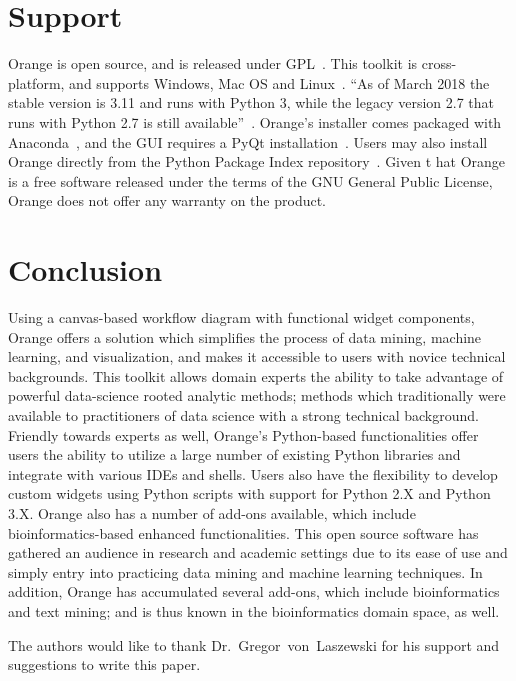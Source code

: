 \section{Support}
Orange is open source, and is released under
GPL~\cite{hid-sp18-504-journalorange}.
This toolkit is cross-platform, and supports Windows, Mac OS and
Linux~\cite{hid-sp18-504-wiki-orange}.
``As of March 2018 the stable version is 3.11 and runs with Python 3,
while the legacy version 2.7 that runs with
Python 2.7 is still available''~\cite{hid-sp18-504-wiki-orange}.
Orange’s installer comes packaged with
Anaconda~\cite{hid-sp18-504-analyticsvidhya}, and the GUI requires a
PyQt installation~\cite{hid-sp18-504-orange}. Users may also install
Orange directly from the Python Package Index
repository~\cite{hid-sp18-504-journalorange}. Given t
hat Orange is a free
software released under the terms of the GNU General Public License,
Orange does not offer any warranty on the product.


\section{Conclusion}

Using a canvas-based workflow diagram with functional widget components,
Orange offers a solution which simplifies the process of data mining,
machine learning, and visualization, and makes it accessible to users with
novice technical backgrounds. This toolkit allows domain experts the ability
to take advantage of powerful data-science rooted analytic methods; methods
which traditionally were available to practitioners of
data science with a strong
technical background. Friendly towards experts as well, Orange’s
Python-based
functionalities offer users the ability to utilize a large number of existing
Python libraries and integrate with various IDEs and shells. Users also have
the flexibility to develop custom widgets using Python scripts with support
for Python 2.X and Python 3.X. Orange also has a number of add-ons available,
which include bioinformatics-based enhanced functionalities. This open
source software has gathered an audience in research and academic
settings due to its ease of use and simply entry into practicing
data mining and machine learning techniques. In addition, Orange
has accumulated several add-ons, which include bioinformatics
and text mining; and is thus known in the bioinformatics
domain space, as well. 


\begin{acks}

  The authors would like to thank Dr.~Gregor~von~Laszewski for his
  support and suggestions to write this paper.

\end{acks}



